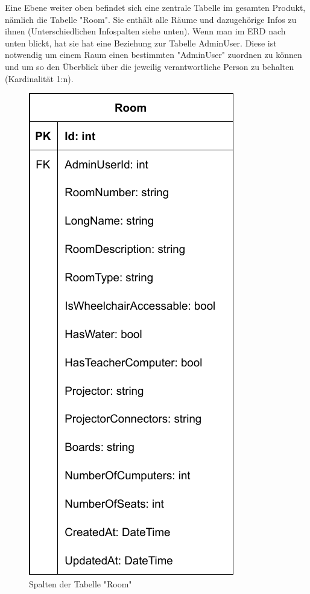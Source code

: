 
Eine Ebene weiter oben befindet sich eine zentrale Tabelle im gesamten Produkt, nämlich die Tabelle "Room". Sie enthält alle Räume und dazugehörige Infos zu ihnen (Unterschiedlichen Infospalten siehe unten). Wenn man im ERD nach unten blickt, hat sie hat eine Beziehung zur Tabelle AdminUser. Diese ist notwendig um einem Raum einen bestimmten "AdminUser" zuordnen zu können und um so den Überblick über die jeweilig verantwortliche Person zu behalten (Kardinalität 1:n).

\begin{figure}[H]
    \centering
    \includegraphics{media/MariaDB/Room.svg.pdf}
    \caption{Spalten der Tabelle "Room"}
\end{figure}

